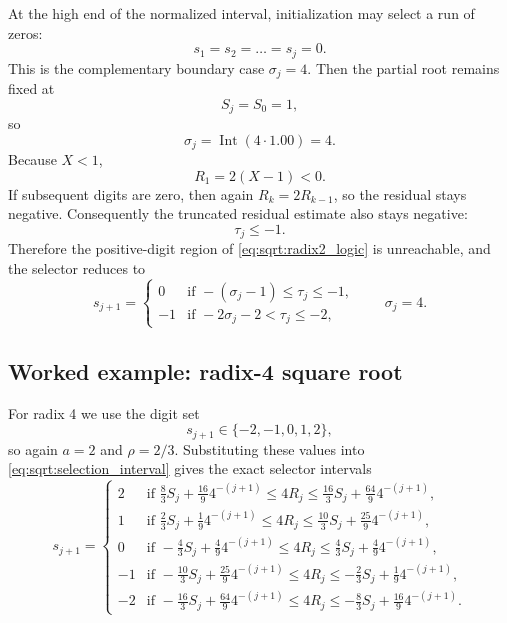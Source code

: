 \documentclass[11pt]{article}
\DeclareMathOperator{\Int}{Int}
\numberwithin{equation}{section}
\begin{document}
At the high end of the normalized interval, initialization may select a run of zeros:
\[
  s_1 = s_2 = \dotsc = s_j = 0.
\]
This is the complementary boundary case $\sigma_j=4$.
Then the partial root remains fixed at
\begin{equation}
  \label{eq:sqrt:radix2_near_one_sj}
  S_j = S_0 = 1,
\end{equation}
so
\begin{equation}
  \label{eq:sqrt:radix2_near_one_sigma}
  \sigma_j = \Int(4\cdot 1.00) = 4.
\end{equation}
Because $X<1$,
\begin{equation}
  \label{eq:sqrt:radix2_near_one_r1}
  R_1 = 2(X-1) < 0.
\end{equation}
If subsequent digits are zero, then again $R_k = 2R_{k-1}$, so the residual stays negative.
Consequently the truncated residual estimate also stays negative:
\begin{equation}
  \label{eq:sqrt:radix2_near_one_tau}
  \tau_j \le -1.
\end{equation}
Therefore the positive-digit region of \cref{eq:sqrt:radix2_logic} is unreachable, and the selector
reduces to
\begin{equation}
  \label{eq:sqrt:radix2_logic_near_one}
  s_{j+1} =
  \begin{cases}
    0  & \text{if } -(\sigma_j-1) \le \tau_j \le -1, \\
    -1 & \text{if } -2\sigma_j - 2 < \tau_j \le -2,
  \end{cases}
  \qquad \sigma_j = 4.
\end{equation}

\subsection{Worked example: radix-4 square root}
\label{ssec:sqrt:radix4}

For radix 4 we use the digit set
\[
  s_{j+1} \in \{-2,-1,0,1,2\},
\]
so again $a=2$ and $\rho=2/3$.
Substituting these values into \cref{eq:sqrt:selection_interval} gives the exact selector intervals
\begin{equation}
  \label{eq:sqrt:radix4_intervals}
  s_{j+1} =
  \begin{cases}
    2  & \text{if } \frac{8}{3}S_j + \frac{16}{9}4^{-(j+1)} \le 4R_j \le \frac{16}{3}S_j + \frac{64}{9}4^{-(j+1)}, \\
    1  & \text{if } \frac{2}{3}S_j + \frac{1}{9}4^{-(j+1)} \le 4R_j \le \frac{10}{3}S_j + \frac{25}{9}4^{-(j+1)}, \\
    0  & \text{if } -\frac{4}{3}S_j + \frac{4}{9}4^{-(j+1)} \le 4R_j \le \frac{4}{3}S_j + \frac{4}{9}4^{-(j+1)}, \\
    -1 & \text{if } -\frac{10}{3}S_j + \frac{25}{9}4^{-(j+1)} \le 4R_j \le -\frac{2}{3}S_j + \frac{1}{9}4^{-(j+1)}, \\
    -2 & \text{if } -\frac{16}{3}S_j + \frac{64}{9}4^{-(j+1)} \le 4R_j \le -\frac{8}{3}S_j + \frac{16}{9}4^{-(j+1)}.
  \end{cases}
\end{equation}
\end{document}
